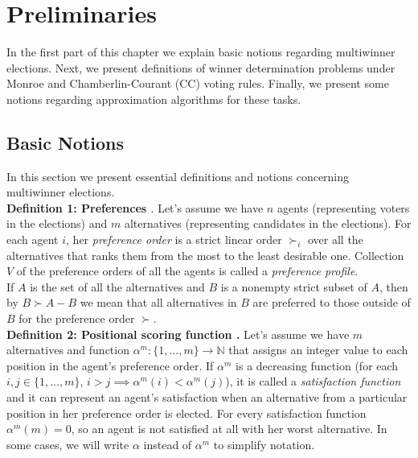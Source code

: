 \chapter{Preliminaries}
\label{cha:preliminaries}

In the first part of this chapter we explain basic notions regarding multiwinner elections. Next, we present definitions of winner determination problems under Monroe and Chamberlin-Courant (CC) voting rules. Finally, we present some notions regarding approximation algorithms for these tasks.

\section{Basic Notions}

In this section we present essential definitions and notions concerning multiwinner elections.
\\

\noindent
\textbf{Definition 1: Preferences \cite{1}}. \hspace{.1in} Let's assume we have $n$ agents (representing voters in the elections) and $m$ alternatives (representing candidates in the elections). For each agent $i$, her \textit{preference order} is a strict linear order $\succ_{i}$ over all the alternatives that ranks them from the most to the least desirable one. Collection $V$ of the preference orders of all the agents is called a \textit{preference profile}.
\\

If $A$ is the set of all the alternatives and $B$ is a nonempty strict subset of $A$, then by $B \succ A - B$ we mean that all alternatives in $B$ are preferred to those outside of $B$ for the preference order $\succ$.
\\

\noindent
\textbf{Definition 2: Positional scoring function \cite{1}.} \hspace{.1in} Let's assume we have $m$ alternatives and function $\alpha^{m}: \{1,...,m\} \rightarrow \mathbb{N}$ that assigns an integer value to each position in the agent's preference order. If $\alpha^{m}$ is a decreasing function (for each $i, j \in \{1,...,m\}$, $i > j \implies \alpha^{m}(i) < \alpha^{m}(j)$), it is called a \textit{satisfaction function} and it can represent an agent's satisfaction when an alternative from a particular position in her preference order is elected. For every satisfaction function $\alpha^{m}(m) = 0$, so an agent is not satisfied at all with her worst alternative. In some cases, we will write $\alpha$ instead of $\alpha^{m}$ to simplify notation.
\\

